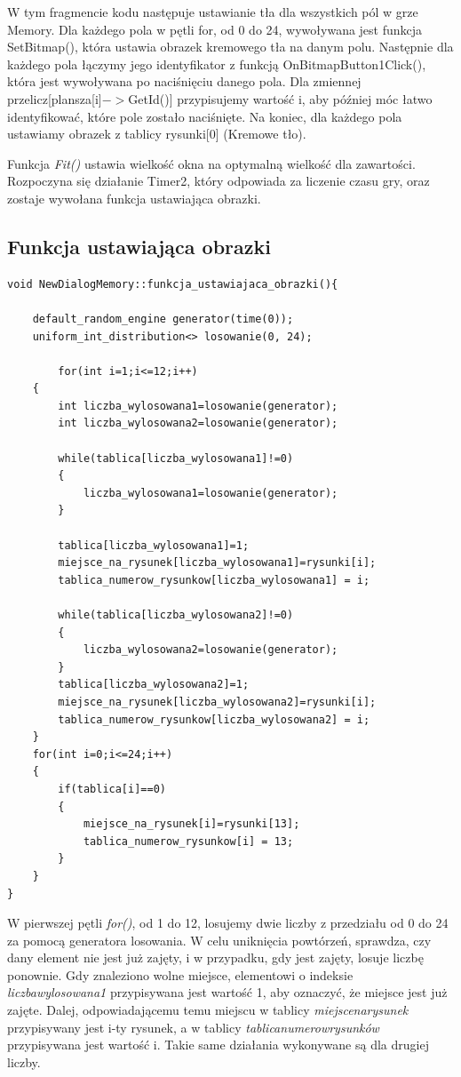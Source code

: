 \documentclass[a4paper]{article}
\begin{document}
W tym fragmencie kodu następuje ustawianie tła dla wszystkich pól w grze Memory. Dla każdego pola w pętli for, od 0 do 24, wywoływana jest funkcja SetBitmap(), która ustawia obrazek kremowego tła na danym polu. Następnie dla każdego pola łączymy jego identyfikator z funkcją OnBitmapButton1Click(), która jest wywoływana po naciśnięciu danego pola. Dla zmiennej przelicz[plansza[i]$->$GetId()] przypisujemy wartość i, aby później móc łatwo identyfikować, które pole zostało naciśnięte. Na koniec, dla każdego pola ustawiamy obrazek z tablicy rysunki[0] (Kremowe tło). 

Funkcja \emph{Fit()} ustawia wielkość okna na optymalną wielkość dla zawartości. Rozpoczyna się działanie Timer2, który odpowiada za liczenie czasu gry, oraz zostaje wywołana funkcja ustawiająca obrazki.  
\subsection{Funkcja ustawiająca obrazki}
\begin{verbatim}
void NewDialogMemory::funkcja_ustawiajaca_obrazki(){

    default_random_engine generator(time(0));
    uniform_int_distribution<> losowanie(0, 24);

        for(int i=1;i<=12;i++)
    {
        int liczba_wylosowana1=losowanie(generator);
        int liczba_wylosowana2=losowanie(generator);

        while(tablica[liczba_wylosowana1]!=0)
        {
            liczba_wylosowana1=losowanie(generator);
        }

        tablica[liczba_wylosowana1]=1;
        miejsce_na_rysunek[liczba_wylosowana1]=rysunki[i];
        tablica_numerow_rysunkow[liczba_wylosowana1] = i;

        while(tablica[liczba_wylosowana2]!=0)
        {
            liczba_wylosowana2=losowanie(generator);
        }
        tablica[liczba_wylosowana2]=1;
        miejsce_na_rysunek[liczba_wylosowana2]=rysunki[i];
        tablica_numerow_rysunkow[liczba_wylosowana2] = i;
    }
    for(int i=0;i<=24;i++)
    {
        if(tablica[i]==0)
        {
            miejsce_na_rysunek[i]=rysunki[13];
            tablica_numerow_rysunkow[i] = 13;
        }
    }
}
\end{verbatim}
W pierwszej pętli \emph{for()}, od 1 do 12, losujemy dwie liczby z przedziału od 0 do 24 za pomocą generatora losowania. W celu uniknięcia powtórzeń, sprawdza, czy dany element nie jest już zajęty, i w przypadku, gdy jest zajęty, losuje liczbę ponownie. Gdy znaleziono wolne miejsce, elementowi o indeksie \emph{liczba\textunderscore wylosowana1} przypisywana jest wartość 1, aby oznaczyć, że miejsce jest już zajęte. Dalej, odpowiadającemu temu miejscu w tablicy \emph{miejsce\textunderscore na\textunderscore rysunek} przypisywany jest i-ty rysunek, a w tablicy \emph{tablica\textunderscore numerow\textunderscore rysunków} przypisywana jest wartość i. Takie same działania wykonywane są dla drugiej liczby.
\end{document}
